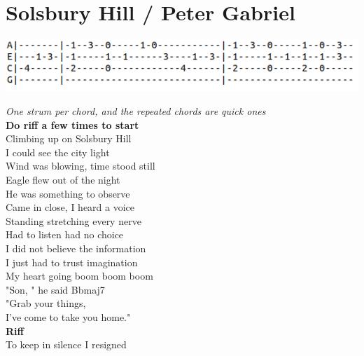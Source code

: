 \section{Solsbury Hill / Peter Gabriel}\label{sec:solsburyhill}
\includegraphics[scale=.6]{songs/s/solsburyhilltab.png}
\Fmajor
\Cmajor
\Dminor
\BflatMajorSeven
\Gminor
\Fmajor
\BflatMajor

\emph{One strum per chord, and the repeated chords are quick ones}\\
\textbf{Do riff a few times to start}\\
   Climbing up on Solsbury Hill\\
   I could see the city light\\
   Wind was blowing, time stood still\\
   Eagle flew out of the night\\
   He was something to observe\\
   Came in close, I heard a voice\\
   Standing stretching every nerve\\
   Had to listen had no choice\\
I did not believe the information\\
I just had to  trust imagination\\
My heart going  boom boom boom\\
"Son, " he  said  {Bbmaj7}\\
"Grab your things,\\
I've come to take you home."\\
\textbf{Riff}\\
   To keep in silence I resigned\\
